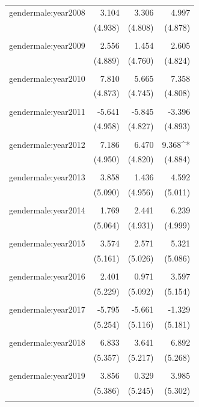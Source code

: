 \documentclass[
]{article}
\begin{document}
\begin{table}[!htbp]
\begin{tabular}{@{\extracolsep{5pt}}lD{.}{.}{-3} D{.}{.}{-3} D{.}{.}{-3} }
 gendermale:year2008 & 3.104 & 3.306 & 4.997 \\ 
  & (4.938) & (4.808) & (4.878) \\ 
  & & & \\ 
 gendermale:year2009 & 2.556 & 1.454 & 2.605 \\ 
  & (4.889) & (4.760) & (4.824) \\ 
  & & & \\ 
 gendermale:year2010 & 7.810 & 5.665 & 7.358 \\ 
  & (4.873) & (4.745) & (4.808) \\ 
  & & & \\ 
 gendermale:year2011 & -5.641 & -5.845 & -3.396 \\ 
  & (4.958) & (4.827) & (4.893) \\ 
  & & & \\ 
 gendermale:year2012 & 7.186 & 6.470 & 9.368^{*} \\ 
  & (4.950) & (4.820) & (4.884) \\ 
  & & & \\ 
 gendermale:year2013 & 3.858 & 1.436 & 4.592 \\ 
  & (5.090) & (4.956) & (5.011) \\ 
  & & & \\ 
 gendermale:year2014 & 1.769 & 2.441 & 6.239 \\ 
  & (5.064) & (4.931) & (4.999) \\ 
  & & & \\ 
 gendermale:year2015 & 3.574 & 2.571 & 5.321 \\ 
  & (5.161) & (5.026) & (5.086) \\ 
  & & & \\ 
 gendermale:year2016 & 2.401 & 0.971 & 3.597 \\ 
  & (5.229) & (5.092) & (5.154) \\ 
  & & & \\ 
 gendermale:year2017 & -5.795 & -5.661 & -1.329 \\ 
  & (5.254) & (5.116) & (5.181) \\ 
  & & & \\ 
 gendermale:year2018 & 6.833 & 3.641 & 6.892 \\ 
  & (5.357) & (5.217) & (5.268) \\ 
  & & & \\ 
 gendermale:year2019 & 3.856 & 0.329 & 3.985 \\ 
  & (5.386) & (5.245) & (5.302) \\ 
  & & & \\ 

\end{tabular}
\end{table}
\end{document}

